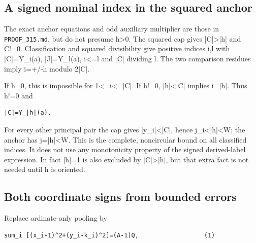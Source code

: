 \subsection{A signed nominal index in the squared anchor}



The exact anchor equations and odd auxiliary multiplier are those in \texttt{PROOF\_\allowbreak{}315.md}, but do not presume h\textgreater{}\allowbreak{}0. The squared cap gives |C|\textgreater{}\allowbreak{}|h| and C!=\allowbreak{}0. Classification and squared divisibility give positive indices i,l with |C|=\allowbreak{}Y\_\allowbreak{}i(a), |J|=\allowbreak{}Y\_\allowbreak{}l(a), i\textless{}\allowbreak{}=\allowbreak{}l and |C| dividing l. The two comparison residues imply i=\allowbreak{}+\allowbreak{}/\allowbreak{}-h modulo 2|C|.



If h=\allowbreak{}0, this is impossible for 1\textless{}\allowbreak{}=\allowbreak{}i\textless{}\allowbreak{}=\allowbreak{}|C|. If h!=\allowbreak{}0, |h|\textless{}\allowbreak{}|C| implies i=\allowbreak{}|h|. Thus h!=\allowbreak{}0 and



\begin{verbatim}
|C|=Y_|h|(a).
\end{verbatim}

For every other principal pair the cap gives |y\_\allowbreak{}i|\textless{}\allowbreak{}|C|, hence j\_\allowbreak{}i\textless{}\allowbreak{}|h|\textless{}\allowbreak{}W; the anchor has j=\allowbreak{}|h|\textless{}\allowbreak{}W. This is the complete, noncircular bound on all classified indices. It does not use any monotonicity property of the signed derived-label expression. In fact |h|=\allowbreak{}1 is also excluded by |C|\textgreater{}\allowbreak{}|h|, but that extra fact is not needed until h is oriented.



\subsection{Both coordinate signs from bounded errors}



Replace ordinate-only pooling by



\begin{verbatim}
sum_i [(x_i-1)^2+(y_i-k_i)^2]=(A-1)Q,                  (1)
\end{verbatim}

